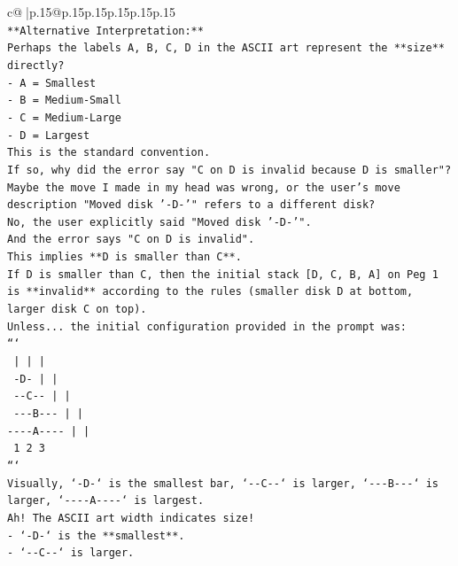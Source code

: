 \documentclass{article}
\begin{document}
{\begin{supertabular}{c@{$\;$}|p{.15\linewidth}@{}p{.15\linewidth}p{.15\linewidth}p{.15\linewidth}p{.15\linewidth}p{.15\linewidth}}
{{{\\ 
\texttt{**Alternative Interpretation:**} \\
\texttt{Perhaps the labels A, B, C, D in the ASCII art represent the **size** directly?} \\
\texttt{{-} A = Smallest} \\
\texttt{{-} B = Medium{-}Small} \\
\texttt{{-} C = Medium{-}Large} \\
\texttt{{-} D = Largest} \\
\texttt{This is the standard convention.} \\
\texttt{If so, why did the error say "C on D is invalid because D is smaller"?} \\
\texttt{Maybe the move I made in my head was wrong, or the user's move description "Moved disk '{-}D{-}'" refers to a different disk?} \\
\texttt{No, the user explicitly said "Moved disk '{-}D{-}'".} \\
\texttt{And the error says "C on D is invalid".} \\
\texttt{This implies **D is smaller than C**.} \\
\texttt{If D is smaller than C, then the initial stack {[}D, C, B, A{]} on Peg 1 is **invalid** according to the rules (smaller disk D at bottom, larger disk C on top).} \\
\texttt{Unless... the initial configuration provided in the prompt was:} \\
\texttt{```} \\
\texttt{    |         |         |    } \\
\texttt{   {-}D{-}        |         |    } \\
\texttt{  {-}{-}C{-}{-}       |         |    } \\
\texttt{ {-}{-}{-}B{-}{-}{-}      |         |    } \\
\texttt{{-}{-}{-}{-}A{-}{-}{-}{-}     |         |    } \\
\texttt{    1         2         3    } \\
\texttt{```} \\
\texttt{Visually, `{-}D{-}` is the smallest bar, `{-}{-}C{-}{-}` is larger, `{-}{-}{-}B{-}{-}{-}` is larger, `{-}{-}{-}{-}A{-}{-}{-}{-}` is largest.} \\
\texttt{Ah! The ASCII art width indicates size!} \\
\texttt{{-} `{-}D{-}` is the **smallest**.} \\
\texttt{{-} `{-}{-}C{-}{-}` is larger.} \\
}}}
\end{supertabular}}
\end{document}
